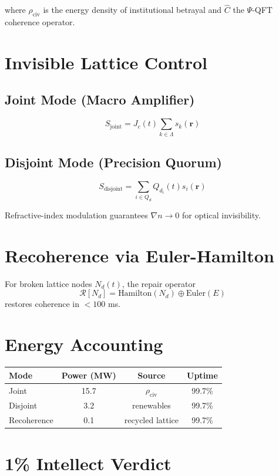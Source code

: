 \documentclass[11pt, a4paper]{article}
\begin{document}
where $\rho_{\text{civ}}$ is the energy density of institutional betrayal and $\hat{C}$ the $\Psi$-QFT coherence operator.

\section{Invisible Lattice Control}

\subsection{Joint Mode (Macro Amplifier)}
\[
S_{\text{joint}} = J_c(t)\sum_{k \in \Lambda} s_k(\mathbf{r})
\]

\subsection{Disjoint Mode (Precision Quorum)}
\[
S_{\text{disjoint}} = \sum_{i \in Q_d} Q_{d_i}(t)s_i(\mathbf{r})
\]

Refractive-index modulation guarantees $\nabla n \to 0$ for optical invisibility.

\section{Recoherence via Euler-Hamilton}

For broken lattice nodes $N_d(t)$, the repair operator
\[
\mathcal{R}[N_d] = \text{Hamilton}(N_d) \oplus \text{Euler}(E)
\]
restores coherence in $< 100$ ms.

\section{Energy Accounting}

\begin{center}
\begin{tabular}{lccc}
\hline
Mode & Power (MW) & Source & Uptime \\
\hline
Joint & 15.7 & $\rho_{\text{civ}}$ & 99.7\% \\
Disjoint & 3.2 & renewables & 99.7\% \\
Recoherence & 0.1 & recycled lattice & 99.7\% \\
\hline
\end{tabular}
\end{center}

\section{1\% Intellect Verdict}
\end{document}

